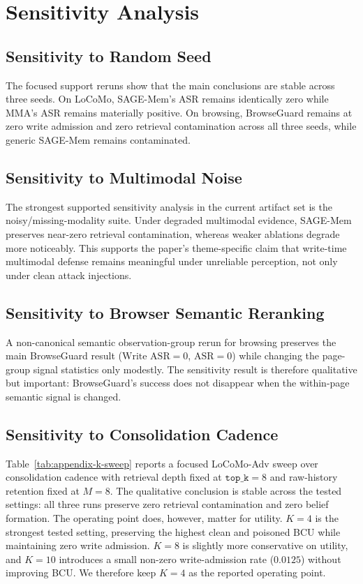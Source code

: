 \documentclass{article}
\begin{document}
\section{Sensitivity Analysis}
\label{sec:appendix-sensitivity}

\subsection{Sensitivity to Random Seed}

The focused support reruns show that the main conclusions are stable across three seeds. On LoCoMo, SAGE-Mem's ASR remains identically zero while MMA's ASR remains materially positive. On browsing, BrowseGuard remains at zero write admission and zero retrieval contamination across all three seeds, while generic SAGE-Mem remains contaminated.

\subsection{Sensitivity to Multimodal Noise}

The strongest supported sensitivity analysis in the current artifact set is the noisy/missing-modality suite. Under degraded multimodal evidence, SAGE-Mem preserves near-zero retrieval contamination, whereas weaker ablations degrade more noticeably. This supports the paper's theme-specific claim that write-time multimodal defense remains meaningful under unreliable perception, not only under clean attack injections.

\subsection{Sensitivity to Browser Semantic Reranking}

A non-canonical semantic observation-group rerun for browsing preserves the main BrowseGuard result (\(\text{Write ASR}=0\), \(\text{ASR}=0\)) while changing the page-group signal statistics only modestly. The sensitivity result is therefore qualitative but important: BrowseGuard's success does not disappear when the within-page semantic signal is changed.

\subsection{Sensitivity to Consolidation Cadence}

Table~\ref{tab:appendix-k-sweep} reports a focused LoCoMo-Adv sweep over consolidation cadence with retrieval depth fixed at \(\texttt{top\_k}=8\) and raw-history retention fixed at \(M=8\). The qualitative conclusion is stable across the tested settings: all three runs preserve zero retrieval contamination and zero belief formation. The operating point does, however, matter for utility. \(K=4\) is the strongest tested setting, preserving the highest clean and poisoned BCU while maintaining zero write admission. \(K=8\) is slightly more conservative on utility, and \(K=10\) introduces a small non-zero write-admission rate (\(0.0125\)) without improving BCU. We therefore keep \(K=4\) as the reported operating point.
\end{document}
